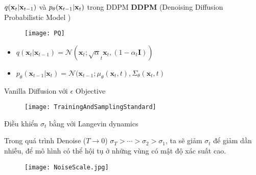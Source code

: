 \begin{frame}{$q(\mathbf{x}_t | \mathbf{x}_{t-1})$ và $p_{\theta}(\mathbf{x}_{t-1} | \mathbf{x}_t ) $  trong DDPM }
	\textbf{DDPM} (Denoising Diffusion Probabilistic Model \cite{ho2020denoisingdiffusionprobabilisticmodels})
\begin{figure}
	\centering
	\texttt{[image: PQ]}
\end{figure}
	
\begin{itemize}
	\item $q (\mathbf{x}_{t} | \mathbf{x}_{t-1}) = \mathcal{N}(\mathbf{x}_t; \sqrt{\alpha}_t \mathbf{x}_t, (1 - \alpha_t \mathbf{I}))$
	\item $p_\theta (\mathbf{x}_{t-1} | \mathbf{x}_{t}) = \mathcal{N}(\mathbf{x}_{t-1}; \mu_\theta{(\mathbf{x}_t, t)}, {\Sigma}_{\theta} {  (\mathbf{x}_t, t ) }$
\end{itemize}
%
%
%

\end{frame}

\begin{frame}{Vanilla Diffusion với $\epsilon$ Objective}
	\begin{figure}
		\centering
		\texttt{[image: TrainingAndSamplingStandard]}
	\end{figure}
\end{frame}

\begin{frame}{Điều khiển $\sigma_t$ bằng với Langevin dynamics}
	
Trong quá trình Denoise ($T \rightarrow 0$)  $\sigma_T > \cdots  >  \sigma_2 > \sigma_1$, ta sẽ giảm $\sigma_t$ để giảm dần nhiễu, để mô hình có thể hội tụ ở những vùng có mật độ xác suất cao.
	\begin{figure}
		\centering
		\texttt{[image: NoiseScale.jpg]}
	\end{figure}
\end{frame}

